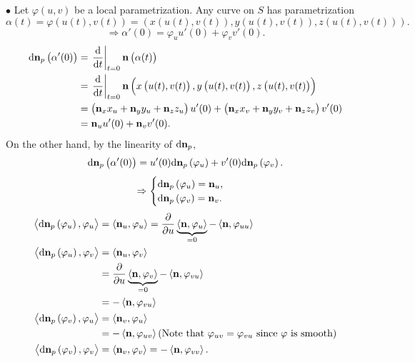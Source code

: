 \(\bullet\) Let \(\varphi(u,v)\) be a local parametrization. 
Any curve on \(S\) has parametrization
\[  
    \alpha(t)=\varphi\left(u(t),v(t)\right)=
    \left(x\left(u(t),v(t)\right),
        y\left(u(t),v(t)\right),
        z\left(u(t),v(t)\right)\right).
\]
\[\Rightarrow \alpha'(0)=\varphi_u u'(0)+\varphi_v v'(0).\]
\begin{align*}
    \dd \vb{n}_p\left(\alpha'(0)\right)
    &=\left.\dv{t}\right|_{t=0}\vb{n}\left(\alpha(t)\right)\\
    &=\left.\dv{t}\right|_{t=0}\vb{n}
    \left(x\left(u(t),v(t)\right),
        y\left(u(t),v(t)\right),
        z\left(u(t),v(t)\right)\right)\\
    &=\left(\vb{n}_x x_u+\vb{n}_y y_u+\vb{n}_z z_u\right)u'(0)
    +\left(\vb{n}_x x_v+\vb{n}_y y_v+\vb{n}_z z_v\right)v'(0)\\    
    &=\vb{n}_u u'(0)+\vb{n}_v v'(0).
\end{align*}
On the other hand, by the linearity of \(\dd \vb{n}_p\), 
\[
    \dd\vb{n}_p\left(\alpha'(0)\right)=u'(0)\dd \vb{n}_p
    \left(\varphi_u\right)+v'(0)\dd\vb{n}_p \left(\varphi_v\right).    
\]
\[
    \Rightarrow
    \begin{cases}
        \dd\vb{n}_p\left(\varphi_u\right)=\vb{n}_u,\\
        \dd\vb{n}_p\left(\varphi_v\right)=\vb{n}_v.
    \end{cases}
\]
\begin{align*}
    \left\langle \dd\vb{n}_p\left(\varphi_u\right),\varphi_u
    \right\rangle
    &=\left\langle\vb{n}_u,\varphi_u\right\rangle=
    \pdv{u}\underbrace{\left\langle\vb{n},\varphi_u\right\rangle}_{=0}
    -\left\langle\vb{n},\varphi_{uu}\right\rangle\\
    \left\langle \dd\vb{n}_p\left(\varphi_u\right),\varphi_v
    \right\rangle
    &=\left\langle\vb{n}_u,\varphi_v\right\rangle\\
    &=\pdv{u}\underbrace{\left\langle\vb{n},\varphi_v\right\rangle}_{=0}
    -\left\langle\vb{n},\varphi_{vu}\right\rangle\\
    &=-\left\langle\vb{n},\varphi_{vu}\right\rangle\\
    \left\langle \dd\vb{n}_p\left(\varphi_v\right),\varphi_u
    \right\rangle
    &=\left\langle\vb{n}_v,\varphi_u\right\rangle\\
    &=-\left\langle\vb{n},\varphi_{uv}\right\rangle
    (\text{Note that }\varphi_{uv}=\varphi_{vu}\text{ since }
    \varphi\text{ is smooth})\\
    \left\langle \dd\vb{n}_p\left(\varphi_v\right),\varphi_v
    \right\rangle
    &=\left\langle\vb{n}_v,\varphi_v\right\rangle
    =-\left\langle \vb{n}, \varphi_{vv}\right\rangle.
\end{align*}

